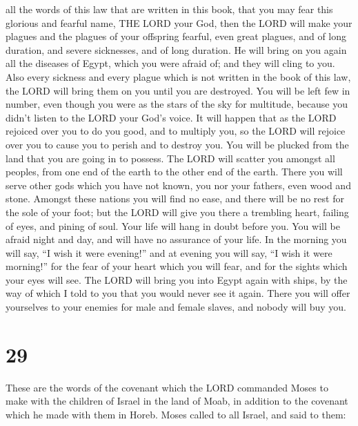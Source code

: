 all the words of this law that are written in this book, that you may
fear this glorious and fearful name, THE LORD your God, 
then the LORD will make your plagues and the plagues of your offspring
fearful, even great plagues, and of long duration, and severe
sicknesses, and of long duration.  He will bring on you
again all the diseases of Egypt, which you were afraid of; and they will
cling to you.  Also every sickness and every plague which
is not written in the book of this law, the LORD will bring them on you
until you are destroyed.  You will be left few in number,
even though you were as the stars of the sky for multitude, because you
didn't listen to the LORD your God's voice.  It will happen
that as the LORD rejoiced over you to do you good, and to multiply you,
so the LORD will rejoice over you to cause you to perish and to destroy
you. You will be plucked from the land that you are going in to possess.
 The LORD will scatter you amongst all peoples, from one
end of the earth to the other end of the earth. There you will serve
other gods which you have not known, you nor your fathers, even wood and
stone.  Amongst these nations you will find no ease, and
there will be no rest for the sole of your foot; but the LORD will give
you there a trembling heart, failing of eyes, and pining of soul.
 Your life will hang in doubt before you. You will be
afraid night and day, and will have no assurance of your life.
 In the morning you will say, ``I wish it were evening!''
and at evening you will say, ``I wish it were morning!'' for the fear of
your heart which you will fear, and for the sights which your eyes will
see.  The LORD will bring you into Egypt again with ships,
by the way of which I told to you that you would never see it again.
There you will offer yourselves to your enemies for male and female
slaves, and nobody will buy you.

\hypertarget{section-28}{%
\section{29}\label{section-28}}

 These are the words of the covenant which the LORD
commanded Moses to make with the children of Israel in the land of Moab,
in addition to the covenant which he made with them in Horeb.
 Moses called to all Israel, and said to them:

